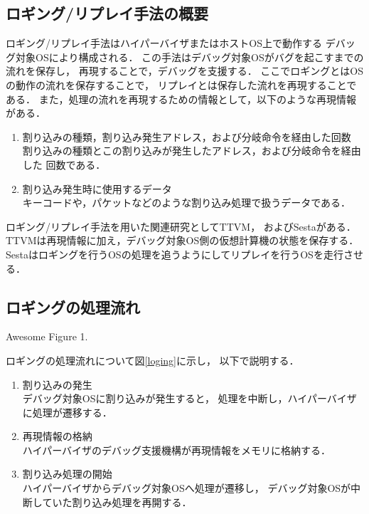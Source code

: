 \documentclass[tanilab-enum]{graduate}
\begin{document}
    \subsection{ロギング/リプレイ手法の概要}
    ロギング/リプレイ手法はハイパーバイザまたはホストOS上で動作する
    デバッグ対象OSにより構成される．
    この手法はデバッグ対象OSがバグを起こすまでの流れを保存し，
    再現することで，デバッグを支援する．
    ここでロギングとはOSの動作の流れを保存することで，
    リプレイとは保存した流れを再現することである．
    また，処理の流れを再現するための情報として，以下のような再現情報
    がある．
    \begin{enumerate}
        \item 割り込みの種類，割り込み発生アドレス，および分岐命令を経由した回数\\
            割り込みの種類とこの割り込みが発生したアドレス，および分岐命令を経由した
            回数である．
        \item 割り込み発生時に使用するデータ\\
            キーコードや，パケットなどのような割り込み処理で扱うデータである．
    \end{enumerate}
    ロギング/リプレイ手法を用いた関連研究としてTTVM\cite{samuel}，
    およびSesta\cite{kawasaki}がある．
    TTVMは再現情報に加え，デバッグ対象OS側の仮想計算機の状態を保存する．
    Sestaはロギングを行うOSの処理を追うようにしてリプレイを行うOSを走行させる．

    \subsection{ロギングの処理流れ}
    {Awesome Figure 1.}

    ロギングの処理流れについて図\ref{loging}に示し，
    以下で説明する．
    \begin{enumerate}
        \item 割り込みの発生\\
            デバッグ対象OSに割り込みが発生すると，
            処理を中断し，ハイパーバイザに処理が遷移する．
        \item 再現情報の格納\\
            ハイパーバイザのデバッグ支援機構が再現情報をメモリに格納する．
        \item 割り込み処理の開始\\
            ハイパーバイザからデバッグ対象OSへ処理が遷移し，
            デバッグ対象OSが中断していた割り込み処理を再開する．
    \end{enumerate}
\end{document}
